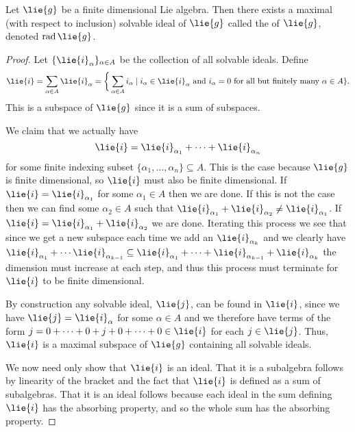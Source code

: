 \documentclass[fleqn]{NotesClass}
\DeclareMathOperator{\rad}{rad}
\begin{document}
    \begin{lma}{}{}
        Let \(\lie{g}\) be a finite dimensional Lie algebra.
        Then there exists a maximal (with respect to inclusion) solvable ideal of \(\lie{g}\) called the  of \(\lie{g}\), denoted \(\rad \lie{g}\).
        \begin{proof}
            Let \(\{\lie{i}_{\alpha}\}_{\alpha \in A}\) be the collection of all solvable ideals.
            Define
            \begin{equation}
                \lie{i} = \sum_{\alpha \in A} \lie{i}_\alpha = \bigg\{\sum_{\alpha \in A} i_\alpha \mid i_\alpha \in \lie{i}_\alpha \text{ and } i_\alpha = 0 \text{ for all but finitely many } \alpha \in A\}.
            \end{equation}
            This is a subspace of \(\lie{g}\) since it is a sum of subspaces.
            
            We claim that we actually have
            \begin{equation}
                \lie{i} = \lie{i}_{\alpha_1} + \dotsb + \lie{i}_{\alpha_n}
            \end{equation}
            for some finite indexing subset \(\{\alpha_1, \dotsc, \alpha_n\} \subseteq A\).
            This is the case because \(\lie{g}\) is finite dimensional, so \(\lie{i}\) must also be finite dimensional.
            If \(\lie{i} = \lie{i}_{\alpha_1}\) for some \(\alpha_1 \in A\) then we are done.
            If this is not the case then we can find some \(\alpha_2 \in A\) such that \(\lie{i}_{\alpha_1} + \lie{i}_{\alpha_2} \ne \lie{i}_{\alpha_1}\).
            If \(\lie{i} = \lie{i}_{\alpha_1} + \lie{i}_{\alpha_2}\) we are done.
            Iterating this process we see that since we get a new subspace each time we add an \(\lie{i}_{\alpha_k}\) and we clearly have \(\lie{i}_{\alpha_1} + \dotsb \lie{i}_{\alpha_{k-1}} \subseteq \lie{i}_{\alpha_1} + \dotsb + \lie{i}_{\alpha_{k-1}} + \lie{i}_{\alpha_k}\) the dimension must increase at each step, and thus this process must terminate for \(\lie{i}\) to be finite dimensional.
            
            By construction any solvable ideal, \(\lie{j}\), can be found in \(\lie{i}\), since we have \(\lie{j} = \lie{i}_{\alpha}\) for some \(\alpha \in A\) and we therefore have terms of the form \(j = 0 + \dotsb + 0 + j + 0 + \dotsb + 0 \in \lie{i}\) for each \(j \in \lie{j}\).
            Thus, \(\lie{i}\) is a maximal subspace of \(\lie{g}\) containing all solvable ideals.
            
            We now need only show that \(\lie{i}\) is an ideal.
            That it is a subalgebra follows by linearity of the bracket and the fact that \(\lie{i}\) is defined as a sum of subalgebras.
            That it is an ideal follows because each ideal in the sum defining \(\lie{i}\) has the absorbing property, and so the whole sum has the absorbing property.
        \end{proof}
    \end{lma}
    
\end{document}
